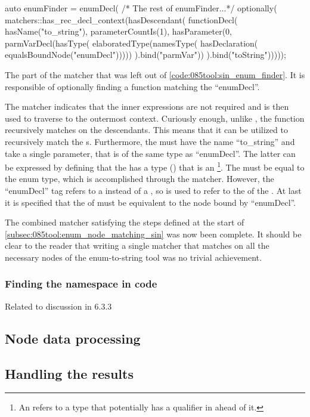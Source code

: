 \begin{listing}[H]
    \begin{cppcode}
auto enumFinder = enumDecl(
  /* The rest of enumFinder...*/
  optionally(
    matchers::has_rec_decl_context(hasDescendant(
      functionDecl(
        hasName("to_string"),
        parameterCountIs(1),
        hasParameter(0,
          parmVarDecl(hasType(
            elaboratedType(namesType(
              hasDeclaration(
                equalsBoundNode("enumDecl")))))
          ).bind("parmVar"))
      ).bind("toString")))));
    \end{cppcode}
    \caption{The part of the  matcher that was left out of \cref{code:085tool:sin_enum_finder}. It is responsible of optionally finding a  function matching the ``enumDecl''.}
    \label{code:085tool:has_enum_to_string}
\end{listing}


The  matcher indicates that the inner expressions are not required and  is then used to traverse to the outermost context.
Curiously enough, unlike , the  function recursively matches on the descendants. This means that it can be utilized to recursively match the s.
Furthermore, the  must have the name ``to\_string'' and take a single parameter, that is of the same type as ``enumDecl''.
The latter can be expressed by defining that the  has a type () that is an \footnote{
    An  refers to a type that potentially has a qualifier in ahead of it.
}.
The  must be equal to the enum type, which is accomplished through the  matcher.
However, the ``enumDecl'' tag refers to a  instead of a , so  is used to refer to the  of the . At last it is specified that the  of must be equivalent to the node bound by ``enumDecl''.

The combined matcher satisfying the steps defined at the start of \cref{subsec:085tool:enum_node_matching_sin} was now been complete.
It should be clear to the reader that writing a single matcher that matches on all the necessary nodes of the enum-to-string tool was no trivial achievement.

\subsubsection*{Finding the namespace in code}
Related to discussion in 6.3.3

\subsection{Node data processing}

\subsection{Handling the results}